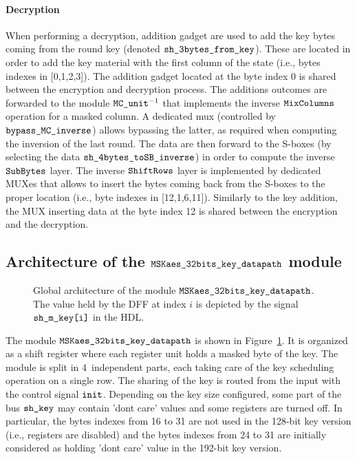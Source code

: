 \documentclass{scrartcl}
\begin{document}
\paragraph{Decryption} When performing a decryption, addition gadget are used to add the key bytes
coming from the round key (denoted
$\texttt{sh\_3bytes\_from\_key}$). These are located in order to add the key
material with the first column of the state (i.e., bytes indexes in [0,1,2,3]).
The addition gadget located at the byte index 0 is shared between the
encryption and decryption process. The additions outcomes are forwarded to the
module $\texttt{MC\_unit}^{-1}$ that implements the inverse $\texttt{MixColumns}$ operation for a
masked column. A dedicated mux (controlled by $\texttt{bypass\_MC\_inverse}$)
allows bypassing the latter, as required when computing the inversion of the
last round. The data are then forward to the S-boxes (by selecting the data
$\texttt{sh\_4bytes\_toSB\_inverse}$) in order to compute the inverse $\texttt{SubBytes}$ layer.  The
inverse $\texttt{ShiftRows}$ layer is implemented by dedicated MUXes that allows to insert the
bytes coming back from the S-boxes to the proper location (i.e., byte indexes in
[12,1,6,11]). Similarly to the key addition, the MUX inserting data at the byte
index 12 is shared between the encryption and the decryption.  

\subsection{Architecture of the $\texttt{MSKaes\_32bits\_key\_datapath}$ module}
\label{section:module_dpkey}
\begin{figure}
    \centering
    \resizebox{\textwidth}{!}{
        \begin{tikzpicture}
            
        \end{tikzpicture}
    }
    \caption{Global architecture of the module $\texttt{MSKaes\_32bits\_key\_datapath}$. The value held by the DFF at index $i$ is depicted by the signal $\texttt{sh\_m\_key[i]}$ in the HDL.}
    \label{fig:aes_dpKey}
\end{figure}

The module $\texttt{MSKaes\_32bits\_key\_datapath}$ is shown in Figure~\ref{fig:aes_dpKey}. It is
organized as a shift register where each register unit holds a masked byte of
the key. The module is split in 4~independent parts, each taking care of the
key scheduling operation on a single row. The sharing of the key is routed from
the input with the control signal $\texttt{init}$. Depending on the key size
configured, some part of the bus $\texttt{sh\_key}$ may contain 'dont care' values
and some registers are turned off. In particular, the bytes indexes from 16 to
31 are not used in the 128-bit key version (i.e., registers are disabled) and
the bytes indexes from 24 to 31 are initially considered as holding 'dont care'
value in the 192-bit key version.
\end{document}
